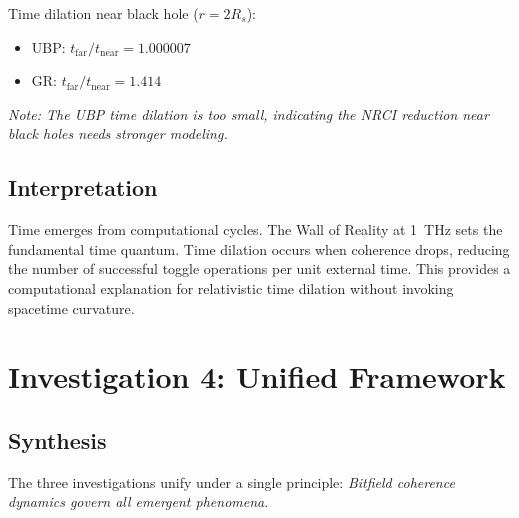 \documentclass[12pt,a4paper]{article}
\begin{document}
Time dilation near black hole ($r = 2R_s$):
\begin{itemize}
\item UBP: $t_{\text{far}}/t_{\text{near}} = 1.000007$
\item GR: $t_{\text{far}}/t_{\text{near}} = 1.414$
\end{itemize}

\textit{Note: The UBP time dilation is too small, indicating the NRCI reduction near black holes needs stronger modeling.}

\subsection{Interpretation}

Time emerges from computational cycles. The Wall of Reality at \SI{1}{THz} sets the fundamental time quantum. Time dilation occurs when coherence drops, reducing the number of successful toggle operations per unit external time. This provides a computational explanation for relativistic time dilation without invoking spacetime curvature.

\section{Investigation 4: Unified Framework}

\subsection{Synthesis}

The three investigations unify under a single principle: \textit{Bitfield coherence dynamics govern all emergent phenomena}.
\end{document}
